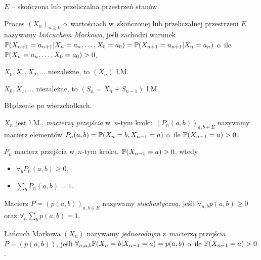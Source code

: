 	$E$ -- skończona lub przeliczalna przestrzeń stanów.
	
	\begin{definition}
		Proces $(X_n)_{n \geq 0}$ o~wartościach w~skończonej 
		lub przeliczalnej przestrzeni $E$ nazywamy
		\emph{łańcuchem Markowa},
		jeśli zachodzi warunek
		$\P(X_{n+1}=a_{n+1} | X_n = a_n, \ldots, X_0 = a_0)
		= \P(X_{n+1} = a_{n+1} | X_n = a_n)$
		o~ile $\P(X_n = a_n, \ldots, X_0 = a_0) > 0$.
	\end{definition}
	
	\begin{example}
		$X_0, X_1, X_2, \ldots$ niezależne, to $(X_n)$ ł.M.
	\end{example}
	
	\begin{example}
		$X_0, X_1, \ldots$ niezależne, to $(S_n = X_n + S_{n-1})$ ł.M.
	\end{example}
	
	\begin{example}
		Błądzenie po wierzchołkach.
	\end{example}
	
	\begin{definition}
		$X_n$ jest ł.M., \emph{macierzą przejścia} w~$n$-tym kroku
		$(P_n(a,b))_{a,b \in E}$ nazywamy macierz elementów
		$P_n(a,b) = \P(X_n = b, X_{n-1} = a)$ 
		o~ile $\P(X_{n-1} = a) > 0$.
	\end{definition}
	
	\begin{remark}
		$P_n$ macierz przejścia w~$n$-tym kroku, $\P(X_{n-1}=a)>0$,
		wtedy
		\begin{itemize}
			\item $\forall_b P_n(a,b) \geq 0$,
			\item $\sum_b P_n(a,b) = 1$.
		\end{itemize}

	\end{remark}
	
	\begin{definition}
		Macierz $P = (p(a,b))_{a,b \in E}$ nazywamy {\em stochastyczną},
		jeśli $\forall_{a,b} p(a,b) \geq 0 $ 
		oraz $\forall_a \sum_b p(a,b) = 1$.
	\end{definition}
	
	\begin{definition}[jednorodny ł. M.]
		Łańcuch Markowa $(X_n)$ nazywamy \emph{jednorodnym} 
		z~macierzą przejścia $P = (p(a,b))$, jeśli
		$\forall_{n,a,b} \P(X_n = b| X_{n-1} = a) = p(a,b)$
		o~ile $\P(X_{n-1} = a) > 0$.
	\end{definition}
	
